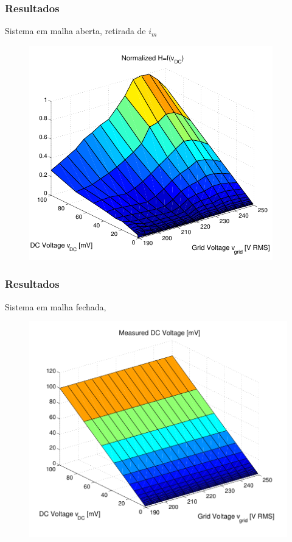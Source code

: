 \documentclass{beamer}
\begin{document}
\begin{frame}
    \frametitle{Resultados}

    Sistema em malha aberta, retirada de $i_m$

    \begin{figure}
        \includegraphics[width=.8\linewidth]{fig7.png}
    \end{figure}
\end{frame}


\begin{frame}
    \frametitle{Resultados}

    Sistema em malha fechada,

    \begin{figure}
        \includegraphics[width=.8\linewidth]{fig8.png}
    \end{figure}
\end{frame}
\end{document}
